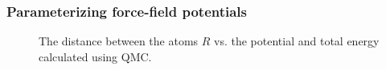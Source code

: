 \begin{frame}
\frametitle{Parameterizing force-field potentials}
 \captionsetup[subfloat]{labelformat=empty}
 \begin{figure}
 \begin{center}
  \caption{The distance between the atoms $R$ vs. the potential and total energy calculated using QMC.}
  \label{fig:molecules_R_vs_E}
 \end{center}
\end{figure}
\end{frame}



 













